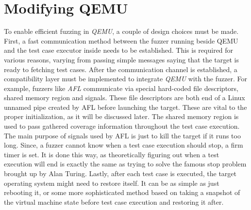 \cleardoublepage
\section{Modifying QEMU} \label{chap:qemu}

To enable efficient fuzzing in \textit{QEMU}, a couple of design choices must be made. First, a fast communication method between the fuzzer running beside QEMU and the test case executor inside needs to be established. This is required for various reasons, varying from passing simple messages saying that the target is ready to fetching test cases. After the communication channel is established, a compatibility layer must be implemented to integrate \textit{QEMU} with the fuzzer. For example, fuzzers like \textit{AFL} communicate via special hard-coded file descriptors, shared memory region and signals. These file descriptors are both end of a Linux unnamed pipe created by AFL before launching the target. These are vital to the proper initialization, as it will be discussed later. The shared memory region is used to pass gathered coverage information throughout the test case execution. The main purpose of signals used by AFL is just to kill the target if it runs too long. Since, a fuzzer cannot know when a test case execution should stop, a firm timer is set. It is done this way, as theoretically figuring out when a test execution will end is exactly the same as trying to solve the famous stop problem brought up by Alan Turing. Lastly, after each test case is executed, the target operating system might need to restore itself. It can be as simple as just rebooting it, or some more sophisticated method based on taking a snapshot of the virtual machine state before test case execution and restoring it after.

